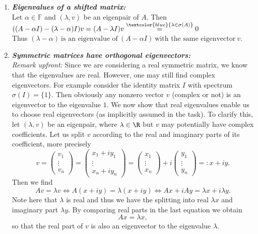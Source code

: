 {\begin{enumerate}
	\textit{Remark:} We call two matrices $A$ and $B$ \textit{similar} if there exists an invertible matrix $T$ such that $B = T^{-1}AT$.
%
%
%
	\item\textbf{\textit{Eigenvalues of a shifted matrix:}}\\ 
		Let $\alpha\in\mathbb{F}$ and $(\lambda,v)$ be an eigenpair of $A$. Then $((A-\alpha I)-(\lambda -\alpha)I)v=(A-\lambda I)v\stackrel{\textcolor{blue}{\lambda\in\sigma(A)}}{=}0$\\
	 Thus ${(\lambda-\alpha)~\text{is an eigenvalue of}~(A-\alpha I)~\text{with the same eigenvector}~v}$.
	\item \textbf{\textit{Symmetric matrices have orthogonal eigenvectors:}}\\ 
	\textit{Remark upfront:} Since we are considering a real symmetric matrix, we know that the eigenvalues are real. However, one may still find complex eigenvectors. For example consider the identity matrix $I$ with spectrum $\sigma(I) = \{1\}$. Then obviously any nonzero vector $v$ (complex or not) is an eigenvector to the eigenvalue $1$. We now show that real eigenvalues enable us to choose real eigenvectors (as implicitly assumed in the task). To clarify this, let $(\lambda,v)$ be an eigenpair, where $\lambda \in \R$ but $v$ may potentially have complex coefficients. Let us split $v$ according to the real and imaginary parts of its coefficient, more precisely
	 $$v = \begin{pmatrix}
	 v_1\\\vdots\\v_n
	 \end{pmatrix}
	 =  \begin{pmatrix}
	 x_1 + i y_1\\\vdots\\ x_n + i y_n
	 \end{pmatrix} = \begin{pmatrix}
	 x_1 \\\vdots\\ x_n
	 \end{pmatrix}+ i \begin{pmatrix}
	 y_1\\\vdots\\  y_n
	 \end{pmatrix} =: x + i y.$$
	 Then we find 
	 $$Av = \lambda v \Leftrightarrow  A(x+iy) = \lambda (x+iy) \Leftrightarrow Ax + i Ay = \lambda x + i \lambda y .$$ Note here that $\lambda$ is real and thus we have the splitting into real $\lambda x $ and imaginary part $\lambda y$. By comparing real parts in the last equation we obtain $$Ax = \lambda x, $$ so that the real part of $v$ is also an eigenvector to the eigenvalue $\lambda$.
	~\\
	

\end{enumerate}}
